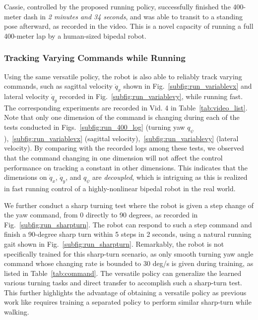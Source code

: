 Cassie, controlled by the proposed running policy, successfully finished the 400-meter dash in \emph{2 minutes and 34 seconds}, and was able to transit to a standing pose afterward, as recorded in the video. 
This is a novel capacity of running a full 400-meter lap by a human-sized bipedal robot. 





\subsubsection{Tracking Varying Commands while Running}
Using the same versatile policy, the robot is also able to reliably track varying commands, such as sagittal velocity $\dot{q}_x$ shown in Fig.~\ref{subfig:run_variablevx} and lateral velocity $\dot{q}_y$ recorded in Fig.~\ref{subfig:run_variablevy}, while running fast. The corresponding experiments are recorded in Vid. 4 in Table~\ref{tab:video_list}. 
Note that only one dimension of the command is changing during each of the tests conducted in Figs.~\ref{subfig:run_400_log} (turning yaw $q_{\psi}$),~\ref{subfig:run_variablevx} (sagittal velocity),~\ref{subfig:run_variablevy} (lateral velocity). 
By comparing with the recorded logs among these tests, we observed that the command changing in one dimension will not affect the control performance on tracking a constant in other dimensions. 
This indicates that the dimensions on $\dot{q}_x$, $\dot{q}_y$, and $q_{\psi}$ are \emph{decoupled}, which is intriguing as this is realized in fast running control of a highly-nonlinear bipedal robot in the real world.











We further conduct a sharp turning test where the robot is given a step change of the yaw command, from 0 directly to 90 degrees, as recorded in Fig.~\ref{subfig:run_sharpturn}. 
The robot can respond to such a step command and finish a 90-degree sharp turn within 5 steps in 2 seconds, using a natural running gait shown in Fig.~\ref{subfig:run_sharpturn}. 
Remarkably, the robot is not specifically trained for this sharp-turn scenario, as only smooth turning yaw angle command whose changing rate is bounded to 30 deg/s is given during training, as listed in Table~\ref{tab:command}. 
The versatile policy can generalize the learned various turning tasks and direct transfer to accomplish such a sharp-turn test. 
This further highlights the advantage of obtaining a versatile policy as previous work like \cite{yu2022dynamic} requires training a separated policy to perform similar sharp-turn while walking. 








